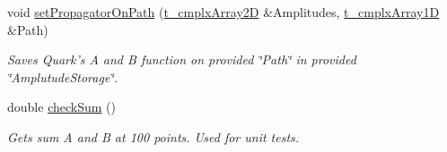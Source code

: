 \begin{DoxyCompactItemize}
void \hyperlink{class_c___quark_aed9615a25b9c0c4f898d92a2b4bd1154}{set\-Propagator\-On\-Path} (\hyperlink{types_8h_a4db8c78f1689c3a957b2866daaae58f2}{t\-\_\-cmplx\-Array2\-D} \&Amplitudes, \hyperlink{types_8h_aab52f79903881ec15d289b3dbfb102fd}{t\-\_\-cmplx\-Array1\-D} \&Path)
\begin{DoxyCompactList}\small\item\em Saves Quark's A and B function on provided \char`\"{}\-Path\char`\"{} in provided \char`\"{}\-Amplutude\-Storage\char`\"{}. \end{DoxyCompactList}\item 
double \hyperlink{class_c___quark_a044cb5ab7b63cca9d4d18792634f5bf1}{check\-Sum} ()
\begin{DoxyCompactList}\small\item\em Gets sum A and B at 100 points. Used for unit tests. \end{DoxyCompactList}\end{DoxyCompactItemize}
